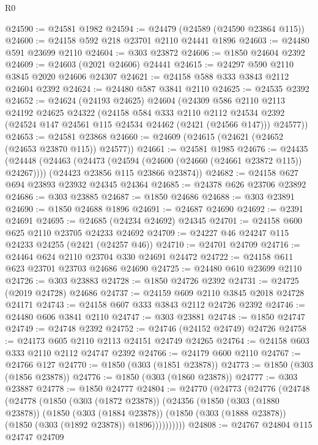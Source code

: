 \begin{lexlean}{R0}
\begin{coremodule}
@24590 := @24581 @1982
@24594 := @24479 (@24589 (@24590 @23864 @115))
@24600 := @24158 @592 @218 @23701 @2110 @24441 @1896
@24603 := @24480 @591 @23699 @2110
@24604 := @303 @23872
@24606 := @1850 @24604 @2392
@24609 := @24603 (@2021 @24606) @24441
@24615 := @24297 @590 @2110 @3845 @2020 @24606 @24307
@24621 := @24158 @588 @333 @3843 @2112 @24604 @2392
@24624 := @24480 @587 @3841 @2110
@24625 := @24535 @2392
@24652 := @24624
    (@24193 @24625)
    @24604
    (@24309
      @586
      @2110
      @2113
      @24192
      @24625
      @24322
      (@24158
        @584
        @333
        @2110
        @2112
        @24534
        @2392
        (@24524 @147 @24561 @115 @24534 @24462 (@2421 (@24566 @147)))
        @24577))
@24653 := @24581 @23868
@24660 := @24609 (@24615 (@24621 (@24652 (@24653 @23870 @115)) @24577))
@24661 := @24581 @1985
@24676 := @24435
    (@24448
      (@24463 (@24473 (@24594 (@24600 (@24660 (@24661 @23872 @115)) @24267))))
      (@24423 @23856 @115 @23866 @23874))
@24682 := @24158 @627 @694 @23893 @23932 @24345 @24364
@24685 := @24378 @626 @23706 @23892
@24686 := @303 @23885
@24687 := @1850 @24686
@24688 := @303 @23891
@24690 := @1850 @24688 @1896
@24691 := @24687 @24690
@24692 := @2391 @24691
@24695 := @24685 (@24234 @24692) @24345
@24701 := @24158 @600 @625 @2110 @23705 @24233 @24692
@24709 := @24227 @46 @24247 @115 @24233 @24255 (@2421 (@24257 @46))
@24710 := @24701 @24709
@24716 := @24464 @624 @2110 @23704 @330 @24691 @24472
@24722 := @24158 @611 @623 @23701 @23703 @24686 @24690
@24725 := @24480 @610 @23699 @2110
@24726 := @303 @23883
@24728 := @1850 @24726 @2392
@24731 := @24725 (@2019 @24728) @24686
@24737 := @24159 @609 @2110 @3845 @2018 @24728 @24171
@24743 := @24158 @607 @333 @3843 @2112 @24726 @2392
@24746 := @24480 @606 @3841 @2110
@24747 := @303 @23881
@24748 := @1850 @24747
@24749 := @24748 @2392
@24752 := @24746 (@24152 @24749) @24726
@24758 := @24173 @605 @2110 @2113 @24151 @24749 @24265
@24764 := @24158 @603 @333 @2110 @2112 @24747 @2392
@24766 := @24179 @600 @2110
@24767 := @24766 @127
@24770 := @1850 (@303 (@1851 @23878))
@24773 := @1850 (@303 (@1856 @23878))
@24776 := @1850 (@303 (@1860 @23878))
@24777 := @303 @23887
@24778 := @1850 @24777
@24804 := @24770
    (@24773
      (@24776
        (@24748
          (@24778
            (@1850
              (@303 (@1872 @23878))
              (@24356
                (@1850
                  (@303 (@1880 @23878))
                  (@1850
                    (@303 (@1884 @23878))
                    (@1850 (@303 (@1888 @23878)) (@1850 (@303 (@1892 @23878)) @1896))))))))))
@24808 := @24767 @24804 @115 @24747 @24709

\end{coremodule}
\end{lexlean}
